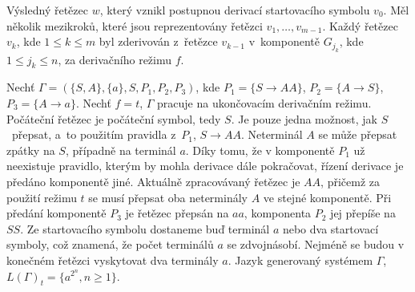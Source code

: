 Výsledný řetězec $w$, který vznikl postupnou derivací startovacího symbolu $v_0$.
Měl několik mezikroků, které jsou reprezentovány řetězci $v_1, \ldots, v_{m-1}$.
Každý řetězec $v_k$, kde $1 \leq k \leq m$ byl zderivován z~řetězce $v_{k-1}$ v~komponentě $G_{j_{k}}$, kde $1 \leq j_k \leq n$, za derivačního režimu $f$.

\begin{example}
    Nechť $\Gamma = (\{S, A\}, \{a\}, S, P_1, P_2, P_3)$, kde $P_1 = \{S \rightarrow AA\}$, $P_2 = \{A \rightarrow S\}$, $P_3 = \{A \rightarrow a\}$.
    Nechť $f = t$, $\Gamma$ pracuje na ukončovacím derivačním režimu.
    Počáteční řetězec je počáteční symbol, tedy $S$. 
    Je pouze jedna možnost, jak $S$~přepsat, a~to použitím pravidla z~$P_1$, $S \rightarrow AA$.
    Neterminál $A$ se může přepsat zpátky na $S$, případně na terminál $a$.
    Díky tomu, že v komponentě $P_1$ už neexistuje pravidlo, kterým by mohla derivace dále pokračovat, řízení derivace je předáno komponentě jiné.
    Aktuálně zpracovávaný řetězec je $AA$, přičemž za použití režimu $t$ se musí přepsat oba neterminály $A$ ve stejné komponentě.
    Při předání komponentě $P_3$ je řetězec přepsán na $aa$, komponenta $P_2$ jej přepíše na $SS$.
    Ze startovacího symbolu dostaneme buď terminál $a$ nebo dva startovací symboly, což znamená, že počet terminálů $a$ se zdvojnásobí.
    Nejméně se budou v konečném řetězci vyskytovat dva terminály $a$.
    Jazyk generovaný systémem $\Gamma$, $L(\Gamma)_t = \{a^{2^n}, n \geq 1 \}$.
    
\end{example}

